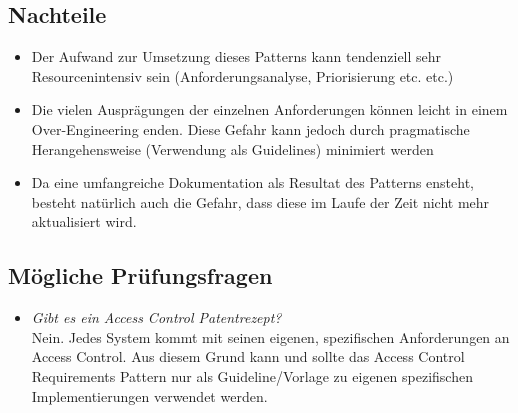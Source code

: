 \subsection*{Nachteile}
\begin{itemize}
	\item Der Aufwand zur Umsetzung dieses Patterns kann tendenziell sehr Resourcenintensiv sein (Anforderungsanalyse, Priorisierung etc. etc.)
	\item Die vielen Ausprägungen der einzelnen Anforderungen können leicht in einem Over-Engineering enden. Diese Gefahr kann jedoch durch pragmatische Herangehensweise (Verwendung als Guidelines) minimiert werden
	\item Da eine umfangreiche Dokumentation als Resultat des Patterns ensteht, besteht natürlich auch die Gefahr, dass diese im Laufe der Zeit nicht mehr aktualisiert wird.
\end{itemize}

\subsection*{Mögliche Prüfungsfragen}
\begin{itemize}
	\item \emph{Gibt es ein Access Control Patentrezept?}\\
	Nein. Jedes System kommt mit seinen eigenen, spezifischen Anforderungen an Access Control. Aus diesem Grund kann und sollte das Access Control Requirements Pattern nur als Guideline/Vorlage zu eigenen spezifischen Implementierungen verwendet werden.
\end{itemize}